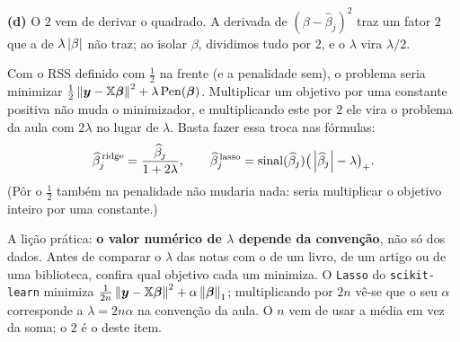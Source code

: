 \begin{solucao}
\smallskip
\textbf{(d)} O $2$ vem de derivar o quadrado. A derivada de $(\beta-\widehat\beta_j)^2$
traz um fator $2$ que a de $\lambda\left\lvert \beta \right\rvert$ não traz; ao isolar $\beta$, dividimos
tudo por $2$, e o $\lambda$ vira $\lambda/2$.

Com o RSS definido com $\tfrac12$ na frente (e a penalidade sem), o problema seria
minimizar $\tfrac12\left\lVert \bm y-\mathbb{X}\bm{\beta} \right\rVert^2+\lambda\,\mathrm{Pen}(\bm{\beta})$.
Multiplicar um objetivo por uma constante positiva não muda o minimizador, e
multiplicando este por $2$ ele vira o problema da aula com $2\lambda$ no lugar de
$\lambda$. Basta fazer essa troca nas fórmulas:
\[
  \widehat\beta_j^{\,\text{ridge}}=\frac{\widehat\beta_j}{1+2\lambda},
  \qquad
  \widehat\beta_j^{\,\text{lasso}}
  =\operatorname{sinal}(\widehat\beta_j)\big(\left\lvert \widehat\beta_j \right\rvert-\lambda\big)_+ .
\]
(Pôr o $\tfrac12$ também na penalidade não mudaria nada: seria multiplicar o objetivo
inteiro por uma constante.)

A lição prática: \textbf{o valor numérico de $\lambda$ depende da convenção}, não só
dos dados. Antes de comparar o $\lambda$ das notas com o de um livro, de um artigo ou
de uma biblioteca, confira qual objetivo cada um minimiza. O \texttt{Lasso} do
\texttt{scikit-learn} minimiza $\tfrac1{2n}\left\lVert \bm y-\mathbb{X}\bm{\beta} \right\rVert^2+\alpha\left\lVert \bm{\beta} \right\rVert_1$;
multiplicando por $2n$ vê-se que o seu $\alpha$ corresponde a $\lambda=2n\alpha$ na
convenção da aula. O $n$ vem de usar a média em vez da soma; o $2$ é o deste item.
\end{solucao}
